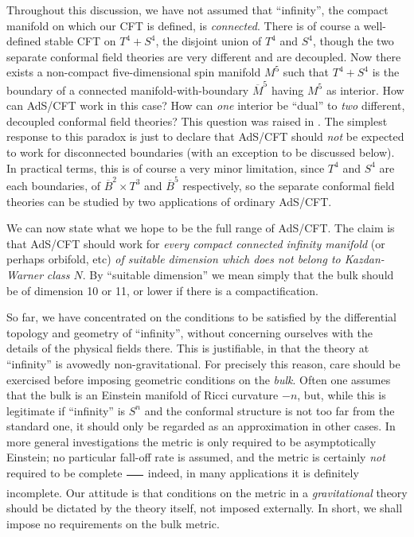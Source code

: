 \documentclass[a4paper,12pt]{article}
\theoremstyle{definition}
\renewcommand{\u}{\textit}
\renewcommand{\-}{$\dfrac{\quad\enspace}{\quad}$}
\begin{document}
Throughout this discussion, we have not assumed that ``infinity'', the compact manifold on which our CFT is defined, is \u{connected}. There is of course a well-defined stable CFT on $T^4+S^4$, the disjoint union of $T^4$ and $S^4$, though the two separate conformal field theories are very different and are decoupled.  Now there exists a non-compact five-dimensional spin manifold $M^5$ such that $T^4+S^4$ is the boundary of a connected manifold-with-boundary $\overline{M}^5$ having $M^5$ as interior. How can AdS/CFT work in this case? How can \u{one} interior be ``dual'' to \u{two} different, decoupled conformal field theories? This question was raised in \cite{4}. The simplest response to this paradox is just to declare that AdS/CFT should \u{not} be expected to work for disconnected boundaries (with an exception to be discussed below). In practical terms, this is of course a very minor limitation, since $T^4$ and $S^4$ are each boundaries, of $\overline{B}^2\times T^3$ and $\overline{B}^5$ respectively, so the separate conformal field theories can be studied by two applications of ordinary AdS/CFT. 

We can now state what we hope to be the full range of AdS/CFT. The claim is that AdS/CFT should work for \u{every compact connected infinity manifold} (or perhaps orbifold, etc) \u{of suitable dimension which does not belong to Kazdan-Warner} \u{class $N$}. By ``suitable dimension'' we mean simply that the bulk should be of dimension 10 or 11, or lower if there is a compactification.

So far, we have concentrated on the conditions to be satisfied by the differential topology and geometry of ``infinity'', without concerning ourselves with the details of the physical fields there. This is justifiable, in that the theory at ``infinity'' is avowedly non-gravitational. For precisely this reason, care should be exercised before imposing geometric conditions on the \u{bulk}. Often one assumes that the bulk is an Einstein manifold of Ricci curvature $-n$, but, while this is legitimate \cite{15} if ``infinity'' is $S^n$ and the conformal structure is not too far from the standard one, it should only be regarded as an approximation in other cases. In more general investigations \cite{16} the metric is only required to be asymptotically Einstein; no particular fall-off rate is assumed, and the metric is certainly \u{not} required to be complete \- indeed, in many applications it is definitely incomplete. Our attitude is that conditions on the metric in a \u{gravitational} theory should be dictated by the theory itself, not imposed externally. In short, we shall impose no requirements on the bulk metric.
\end{document}
